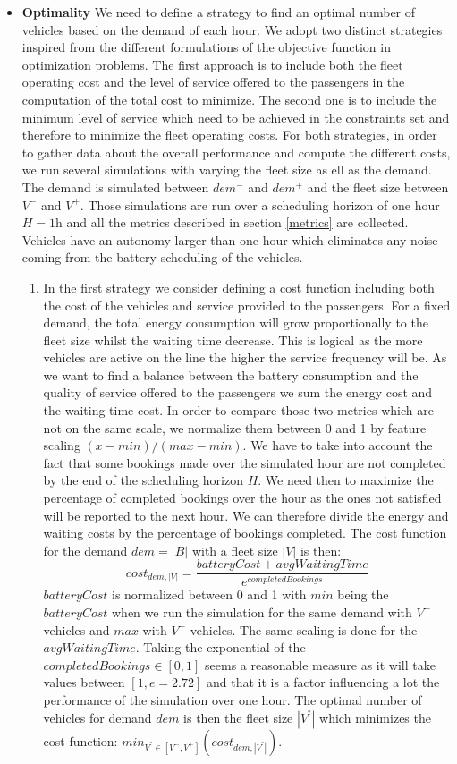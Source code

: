 \documentclass[12pt,a4paper]{article}
\begin{document}
\begin{itemize}
\item \textbf{Optimality} We need to define a strategy to find an optimal number of vehicles based on the demand of each hour. We adopt two distinct strategies inspired from the different formulations of the objective function in optimization problems. The first approach is to include both the fleet operating cost and the level of service offered to the passengers in the computation of the total cost to minimize. The second one is to include the minimum level of service which need to be achieved in the constraints set and therefore to minimize the fleet operating costs. For both strategies, in order to gather data about the overall performance and compute the different costs, we run several simulations with varying the fleet size as ell as the demand. The demand is simulated between $dem^{-}$ and $dem^{+}$ and the fleet size between $V^{-}$ and $V^{+}$. Those simulations are run over a scheduling horizon of one hour $H = 1$h and all the metrics described in section \ref{metrics} are collected. Vehicles have an autonomy larger than one hour which eliminates any noise coming from the battery scheduling of the vehicles. 
\begin{enumerate}
\setlength\itemsep{1pt} 
\item In the first strategy we consider defining a cost function including both the cost of the vehicles and service provided to the passengers. For a fixed demand, the total energy consumption will grow proportionally to the fleet size whilst the waiting time decrease. This is logical as the more vehicles are active on the line the higher the service frequency will be. As we want to find a balance between the battery consumption and the quality of service offered to the passengers we sum the energy cost and the waiting time cost. In order to compare those two metrics which are not on the same scale, we normalize them between 0 and 1 by feature scaling $(x-min)/(max-min)$. We have to take into account the fact that some bookings made over the simulated hour are not completed by the end of the scheduling horizon $H$. We need then to maximize the percentage of completed bookings over the hour as the ones not satisfied will be reported to the next hour. We can therefore divide the energy and waiting costs by the percentage of bookings completed. The cost function for the demand $dem = |B|$ with a fleet size $|V|$ is then:
$$ cost_{dem, |V|} = \frac{batteryCost + avgWaitingTime}{e^{completedBookings}}$$
$batteryCost$ is normalized between 0 and 1 with $min$ being the $batteryCost$ when we run the simulation for the same demand with $V^{-}$ vehicles and $max$ with $V^{+}$ vehicles. The same scaling is done for the $avgWaitingTime$. Taking the exponential of the $completedBookings \in [0,1]$ seems a reasonable measure as it will take values between $[1, e = 2.72]$ and that it is a factor influencing a lot the performance of the simulation over one hour. The optimal number of vehicles for demand $dem$ is then the fleet size $|V^{°}|$ which minimizes the cost function: $min_{V^{°}\in[V^{-}, V^{+}]} (cost_{dem, |V^{°}|})$.

\end{enumerate}
\end{itemize}
\end{document}

